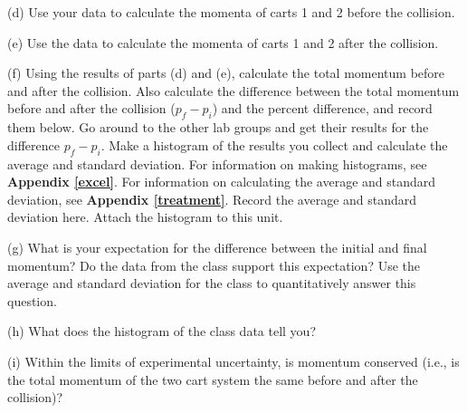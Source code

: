 \newpage
(d) Use your data to calculate the momenta of carts 1 and 2 before the collision.
\vspace{30mm}

(e) Use the data to calculate the momenta of carts 1 and 2 after the collision.
\vspace{30mm}

(f) Using the results of parts (d) and (e), calculate the total momentum before and after the collision. 
Also calculate the difference between the total momentum before and after the collision ($p_f - p_i$) and the percent difference, and record them below.
Go around to the other lab groups and get their results for the difference $p_f - p_i$.
Make a histogram of the results you collect and calculate the average and standard deviation.
For information on making histograms, see \textbf{Appendix \ref{excel}}. For information on calculating the average and
standard deviation, see \textbf{Appendix \ref{treatment}}. Record the average and standard deviation here.
Attach the histogram to this unit.
\vspace{40mm}

(g) What is your expectation for the difference between the initial and final momentum? Do the data from the class support this expectation?  Use the average and standard deviation for the class to quantitatively answer this question.
\vspace{20mm}

(h) What does the histogram of the class data tell you?
\vspace{20mm}

(i) Within the limits of experimental uncertainty, is momentum 
conserved (i.e., is the total momentum of the two cart system the same before
and after the collision)?

